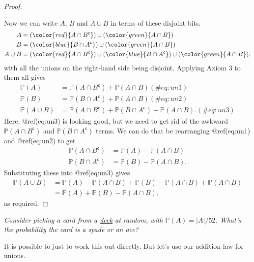 \documentclass[
  letterpaper,
]{report}
\theoremstyle{definition}
\theoremstyle{definition}
\theoremstyle{remark}
\begin{document}
\begin{proof}
\begin{figure}
{}

\end{figure}

Now we can write \(A\), \(B\) and \(A \cup B\) in terms of these
disjoint bits. \begin{align}
A &= (\color{red}{A \cap B^\mathsf{c}}) \cup (\color{green}{A \cap B}) \\
B &= (\color{blue}{B \cap A^\mathsf{c}}) \cup (\color{green}{A \cap B}) \\
A \cup B &= (\color{red}{A \cap B^\mathsf{c}}) \cup (\color{blue}{B \cap A^\mathsf{c}}) \cup (\color{green}{A \cap B}),
\end{align} with all the unions on the right-hand side being disjoint.
Applying Axiom 3 to them all gives \begin{align}
\mathbb P(A) &= \mathbb P(A \cap B^\mathsf{c}) + \mathbb P(A \cap B) (\#eq:un1)  \\
\mathbb P(B) &= \mathbb P(B \cap A^\mathsf{c}) + \mathbb P(A \cap B)  (\#eq:un2) \\
\mathbb P(A \cup B) &= \mathbb P(A \cap B^\mathsf{c}) + \mathbb P(B \cap A^\mathsf{c}) + \mathbb P(A \cap B) . (\#eq:un3)
\end{align} Here, @ref(eq:un3) is looking good, but we need to get rid
of the awkward \(\mathbb P(A \cap B^\mathsf{c})\) and
\(\mathbb P(B \cap A^\mathsf{c})\) terms. We can do that be rearranging
@ref(eq:un1) and @ref(eq:un2) to get \begin{align}
\mathbb P(A \cap B^\mathsf{c}) &= \mathbb P(A) - \mathbb P(A \cap B) \\
\mathbb P(B \cap A^\mathsf{c}) &= \mathbb P(B) - \mathbb P(A \cap B) .
\end{align} Substituting these into @ref(eq:un3) gives \begin{align}
\mathbb P(A \cup B) &= \mathbb P(A) - \mathbb P(A \cap B) + \mathbb P(B) - \mathbb P(A \cap B) + \mathbb P(A \cap B) \\
  &= \mathbb P(A)+ \mathbb P(B) - \mathbb P(A \cap B) ,
\end{align} as required.

\end{proof}

\emph{Consider picking a card from a
\href{https://en.wikipedia.org/wiki/Standard_52-card_deck}{deck} at
random, with \(\mathbb P(A) = |A|/52\). What's the probability the card
is a spade or an ace?}

It is possible to just to work this out directly. But let's use our
addition law for unions.
\end{document}

